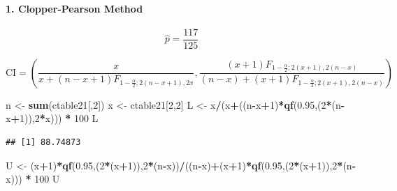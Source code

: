 \documentclass[]{article}
\newenvironment{Shaded}{\begin{snugshade}}{\end{snugshade}}
\newcommand{\DecValTok}[1]{\textcolor[rgb]{0.00,0.00,0.81}{#1}}
\newcommand{\FloatTok}[1]{\textcolor[rgb]{0.00,0.00,0.81}{#1}}
\newcommand{\KeywordTok}[1]{\textcolor[rgb]{0.13,0.29,0.53}{\textbf{#1}}}
\newcommand{\NormalTok}[1]{#1}
\newcommand{\OperatorTok}[1]{\textcolor[rgb]{0.81,0.36,0.00}{\textbf{#1}}}
\newcommand{\StringTok}[1]{\textcolor[rgb]{0.31,0.60,0.02}{#1}}
\let\oldparagraph\paragraph
\renewcommand{\paragraph}[1]{\oldparagraph{#1}\mbox{}}
\begin{document}
\hypertarget{clopper-pearson-method}{%
\paragraph{1. Clopper-Pearson Method}\label{clopper-pearson-method}}

\[
\hat{p} = \frac{117}{125}
\]

\[
\text{CI} = (\frac{x}{x+(n-x+1)F_{1-\frac{\alpha}{2};2(n-x+1),2x}},\frac{(x+1)F_{1-\frac{\alpha}{2};2(x+1),2(n-x)}}{(n-x)+(x+1)F_{1-\frac{\alpha}{2};2(x+1),2(n-x)}})
\]

\begin{Shaded}
\begin{Highlighting}[]
\NormalTok{n <-}\StringTok{ }\KeywordTok{sum}\NormalTok{(ctable21[,}\DecValTok{2}\NormalTok{])}
\NormalTok{x <-}\StringTok{ }\NormalTok{ctable21[}\DecValTok{2}\NormalTok{,}\DecValTok{2}\NormalTok{]}
\NormalTok{L <-}\StringTok{ }\NormalTok{x}\OperatorTok{/}\NormalTok{(x}\OperatorTok{+}\NormalTok{((n}\OperatorTok{-}\NormalTok{x}\OperatorTok{+}\DecValTok{1}\NormalTok{)}\OperatorTok{*}\KeywordTok{qf}\NormalTok{(}\FloatTok{0.95}\NormalTok{,(}\DecValTok{2}\OperatorTok{*}\NormalTok{(n}\OperatorTok{-}\NormalTok{x}\OperatorTok{+}\DecValTok{1}\NormalTok{)),}\DecValTok{2}\OperatorTok{*}\NormalTok{x))) }\OperatorTok{*}\StringTok{ }\DecValTok{100}
\NormalTok{L}
\end{Highlighting}
\end{Shaded}

\begin{verbatim}
## [1] 88.74873
\end{verbatim}

\begin{Shaded}
\begin{Highlighting}[]
\NormalTok{U <-}\StringTok{ }\NormalTok{(x}\OperatorTok{+}\DecValTok{1}\NormalTok{)}\OperatorTok{*}\KeywordTok{qf}\NormalTok{(}\FloatTok{0.95}\NormalTok{,(}\DecValTok{2}\OperatorTok{*}\NormalTok{(x}\OperatorTok{+}\DecValTok{1}\NormalTok{)),}\DecValTok{2}\OperatorTok{*}\NormalTok{(n}\OperatorTok{-}\NormalTok{x))}\OperatorTok{/}\NormalTok{((n}\OperatorTok{-}\NormalTok{x)}\OperatorTok{+}\NormalTok{(x}\OperatorTok{+}\DecValTok{1}\NormalTok{)}\OperatorTok{*}\KeywordTok{qf}\NormalTok{(}\FloatTok{0.95}\NormalTok{,(}\DecValTok{2}\OperatorTok{*}\NormalTok{(x}\OperatorTok{+}\DecValTok{1}\NormalTok{)),}\DecValTok{2}\OperatorTok{*}\NormalTok{(n}\OperatorTok{-}\NormalTok{x))) }\OperatorTok{*}\StringTok{ }\DecValTok{100}
\NormalTok{U}
\end{Highlighting}
\end{Shaded}
\end{document}
